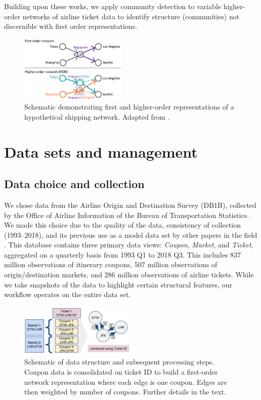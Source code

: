 \documentclass[sigconf]{acmart}
\begin{document}
Building upon these works, we apply community detection to variable higher-order networks of airline ticket data to identify structure (communities) not discernible with first order representations.

\begin{figure}[t]
    \centering
    \includegraphics[width=0.45\textwidth]{figs/hon_schematic.jpg}
    \caption{Schematic demonstrating first and higher-order representations of a hypothetical shipping network. Adapted from \cite{Xu2016}.}
    \label{fig:hon_schematic}
\end{figure}

\section{Data sets and management}  \label{sec:data}

\subsection{Data choice and collection}
We chose data from the Airline Origin and Destination Survey (DB1B), collected by the Office of Airline Information of the Bureau of Transportation Statistics. We made this choice due to the quality of the data, consistency of collection (1993--2018), and its previous use as a model data set by other papers in the field \cite{AirlineData}. This database contains three primary data views: \textit{Coupon}, \textit{Market}, and \textit{Ticket}, aggregated on a quarterly basis from 1993 Q1 to 2018 Q3. This includes 837 million observations of itinerary coupons, 507 million observations of origin/destination markets, and 286 million observations of airline tickets. While we take snapshots of the data to highlight certain structural features, our workflow operates on the entire data set. 

\begin{figure}[t]
    \centering
    \includegraphics[width=0.5\textwidth]{figs/ticket_data.png}
    \caption{Schematic of data structure and subsequent processing steps. Coupon data is consolidated on ticket ID to build a first-order network representation where each edge is one coupon. Edges are then weighted by number of coupons. Further details in the text.}
    \label{fig:data}
\end{figure}
\end{document}
